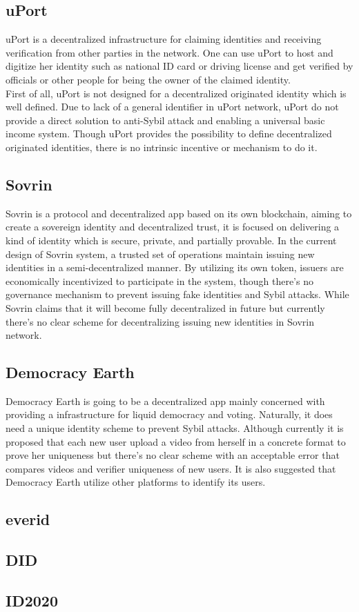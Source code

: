 \documentclass[conference]{IEEEtran}
\begin{document}
\subsection{uPort}

uPort is a decentralized infrastructure for claiming identities and receiving verification from other parties in the network. One can use uPort to host and digitize her identity such as national ID card or driving license and get verified by officials or other people for being the owner of the claimed identity.\\
 First of all, uPort is not designed for a decentralized originated identity which is well defined. Due to lack of a general identifier in uPort network, uPort do not provide a direct solution to anti-Sybil attack and enabling a universal basic income system. Though uPort provides the possibility to define decentralized originated identities, there is no intrinsic incentive or mechanism to do it.

\subsection{Sovrin}

Sovrin is a protocol and decentralized app based on its own blockchain, aiming to create a sovereign identity and decentralized trust, it is focused on delivering a kind of identity which is secure, private, and partially provable. In the current design of Sovrin system, a trusted set of operations maintain issuing new identities in a semi-decentralized manner. By utilizing its own token, issuers are economically incentivized to participate in the system, though there’s no governance mechanism to prevent issuing fake identities and Sybil attacks. While Sovrin claims that it will become fully decentralized in future but currently there’s no clear scheme for decentralizing issuing new identities in Sovrin network. 

\subsection{Democracy Earth}
Democracy Earth is going to be a decentralized app mainly concerned with providing a infrastructure for liquid democracy and voting. Naturally, it does need a unique identity scheme to prevent Sybil attacks. Although currently it is proposed that each new user upload a video from herself in a concrete format to prove her uniqueness but there’s no clear scheme with an acceptable error that compares videos and verifier uniqueness of new users. It is also suggested that Democracy Earth utilize other platforms to identify its users.
\subsection{everid}
\subsection{ DID}
\subsection{ID2020}

\end{document}
